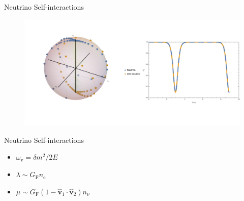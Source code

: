\documentclass[9pt]{beamer}
\begin{document}
\begin{darkframes}
\begin{frame}{Neutrino Self-interactions}
\begin{tcolorbox}
{   \begin{figure}
      \includegraphics[width=\textwidth]{assets/bipolar-animation/bipolar-animie089.png}
   \end{figure}
   }
\end{tcolorbox}




\end{frame}



\begin{frame}{Neutrino Self-interactions}


   \begin{tcolorbox}[title=Characteristic Energy Scales,standard jigsaw,
    opacityback=0]

      \begin{itemize}
         \item  $\omega_{\mathrm v} = \delta m^2\big/2E $
         \item  $\lambda \sim G_{\mathrm F} n_{\mathrm e}$
         \item  $\mu \sim G_{\mathrm F} (1- \hat{\boldsymbol{ v} }_1 \cdot \hat{\boldsymbol{v}}_2) n_{\nu} $
      \end{itemize}


\end{tcolorbox}
\end{frame}
\end{darkframes}
\end{document}
